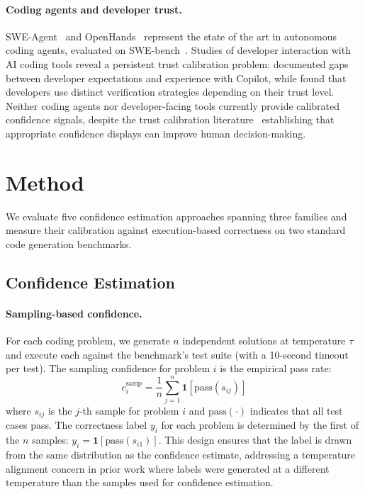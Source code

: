 \documentclass{article}
\begin{document}
\paragraph{Coding agents and developer trust.}
SWE-Agent~\citep{yang2024swe} and OpenHands~\citep{wang2024opendevin} represent the state of the art in autonomous coding agents, evaluated on SWE-bench~\citep{jimenez2024swe}. Studies of developer interaction with AI coding tools reveal a persistent trust calibration problem: \citet{vaithilingam2022expectation} documented gaps between developer expectations and experience with Copilot, while \citet{mozannar2024reading} found that developers use distinct verification strategies depending on their trust level. Neither coding agents nor developer-facing tools currently provide calibrated confidence signals, despite the trust calibration literature~\citep{lee2004trust, yin2019understanding, zhang2020effect, bansal2021does} establishing that appropriate confidence displays can improve human decision-making.

\section{Method}
\label{sec:method}

We evaluate five confidence estimation approaches spanning three families and measure their calibration against execution-based correctness on two standard code generation benchmarks.

\subsection{Confidence Estimation}
\label{sec:confidence}

\paragraph{Sampling-based confidence.}
For each coding problem, we generate $n$ independent solutions at temperature $\tau$ and execute each against the benchmark's test suite (with a 10-second timeout per test). The sampling confidence for problem $i$ is the empirical pass rate:
\begin{equation}
  c_i^{\text{samp}} = \frac{1}{n}\sum_{j=1}^{n} \mathbf{1}[\text{pass}(s_{ij})]
  \label{eq:sampling}
\end{equation}
where $s_{ij}$ is the $j$-th sample for problem $i$ and $\text{pass}(\cdot)$ indicates that all test cases pass. The correctness label $y_i$ for each problem is determined by the first of the $n$ samples: $y_i = \mathbf{1}[\text{pass}(s_{i1})]$. This design ensures that the label is drawn from the same distribution as the confidence estimate, addressing a temperature alignment concern in prior work where labels were generated at a different temperature than the samples used for confidence estimation.
\end{document}
